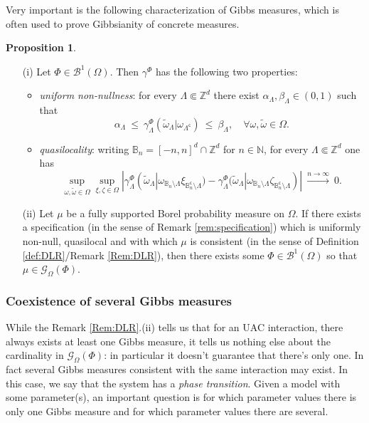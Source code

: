 \documentclass[12pt]{article}
\newcommand{\BB}{\mathscr{B}}
\newcommand{\BBB}{\mathbb{B}}
\newcommand{\G}{\mathcal{G}}
\newcommand{\N}{\mathbb{N}}
\newcommand{\Z}{\mathbb{Z}}
\newcommand{\ra}{\rightarrow}
\newcommand{\1}{\mathbbm{1}}
\renewcommand{\c}{\mathsf{c}}
\newcommand{\5}{\vspace{0.5cm}}
\renewcommand{\tilde}{\widetilde}
\theoremstyle{definition}
\newtheorem{prop}[thm]{Proposition}
\begin{document}
Very important is the following characterization of Gibbs measures, which is often used to prove Gibbsianity of concrete measures.
\begin{prop}\label{DLR:equiv}
~
\begin{itemize}
	\item[(i)] Let $\Phi\in\BB^1(\Omega)$. Then $\gamma^\Phi$ has the following two properties:
		\begin{itemize}
			\item \textit{uniform non-nullness}: for every $\Lambda\Subset\Z^d$ there exist $\alpha_\Lambda,\beta_\Lambda\in(0,1)$ such that
			$$\alpha_\Lambda ~\leq~ \gamma_\Lambda^\Phi(\tilde{\omega}_\Lambda|\omega_{\Lambda^\c}) ~\leq~ \beta_\Lambda, \quad\forall\omega,\tilde{\omega}\in\Omega.$$
			\item \textit{quasilocality}: writing $\BBB_n=[-n,n]^d\cap\Z^d$ for $n\in\N$, for every $\Lambda\Subset\Z^d$ one has
			$$\sup_{\omega,\tilde{\omega}\in\Omega}\sup_{\xi,\zeta\in\Omega}|\gamma_\Lambda^\Phi(\tilde{\omega}_\Lambda|\omega_{\BBB_n\setminus\Lambda}\xi_{\BBB_n^\c\setminus\Lambda})-\gamma_\Lambda^\Phi(\tilde{\omega}_\Lambda|\omega_{\BBB_n\setminus\Lambda}\zeta_{\BBB_n^\c\setminus\Lambda})| ~\xrightarrow{n\ra\infty}~ 0.$$
		\end{itemize}
		\item[(ii)] Let $\mu$ be a fully supported Borel probability measure on $\Omega$. If there exists a specification (in the sense of Remark \ref{rem:specification}) which is uniformly non-null, quasilocal and with which $\mu$ is consistent (in the sense of Definition \ref{def:DLR}/Remark \ref{Rem:DLR}), then there exists some $\Phi\in\BB^1(\Omega)$ so that $\mu\in\G_\Omega(\Phi)$.
		
\end{itemize}
\end{prop}


\subsubsection{Coexistence of several Gibbs measures}

While the Remark \ref{Rem:DLR}.(ii) tells us that for an UAC interaction, there always exists at least one Gibbs measure, it tells us nothing else about the cardinality in $\G_\Omega(\Phi)$: in particular it doesn't guarantee that there's only one. In fact several Gibbs measures consistent with the same interaction may exist. In this case, we say that the system has a \textit{phase transition}. Given a model with some parameter(s), an important question is for which parameter values there is only one Gibbs measure and for which parameter values there are several. \\
\end{document}
